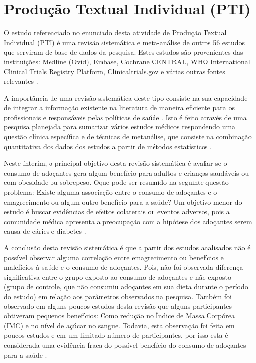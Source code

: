 \chapter{Produção Textual Individual (PTI)}
\label{pti}

O estudo referenciado no enunciado desta atividade de Produção Textual Individual (PTI)
é uma revisão sistemática e meta-análise
de outros 56 estudos que serviram de base de dados da pesquisa.
Estes estudos são provenientes das
instituições:
Medline (Ovid), Embase, Cochrane CENTRAL, WHO
International Clinical Trials Registry Platform,
Clinicaltrials.gov e várias outras fontes relevantes \cite{estudo}.

A importância de uma revisão sistemática deste tipo consiste na sua capacidade de integrar
a informação existente na literatura de maneira eficiente para os profissionais e
responsáveis pelas políticas de saúde \cite{mulrow}. Isto é feito
através de uma pesquisa planejada para sumarizar vários estudos
médicos respondendo uma questão clínica específica e de técnicas de
metanálise, que consiste na combinação
quantitativa dos dados dos estudos a partir de métodos estatísticos \cite{meta}.


Neste ínterim, o principal objetivo desta revisão sistemática é
avaliar se o consumo de adoçantes
gera algum benefício para
adultos e crianças saudáveis ou com obesidade ou sobrepeso. Oque pode ser
resumido na seguinte questão-problema: Existe alguma associação entre o consumo de adoçantes
e o emagrecimento ou algum outro benefício para a saúde?
Um objetivo menor do estudo é buscar evidências de efeitos colaterais ou eventos adversos,
pois a comunidade médica apresenta a preocupação com a hipótese dos adoçantes serem causa
de cáries e diabetes \cite{estudo}. 

A conclusão desta revisão sistemática é
que a partir dos estudos analisados não é possível observar alguma correlação entre
emagrecimento ou benefícios e malefícios à saúde e o consumo de adoçantes.
Pois, não foi observada diferença significativa
entre o grupo exposto ao consumo de adoçantes e não exposto (grupo de controle, que não consumiu adoçantes em sua dieta durante o período do estudo) em relação aos parâmetros observados na pesquisa.
Também foi observado em alguns poucos estudos desta revisão
que alguns participantes obtiveram pequenos benefícios: Como
redução no Índice de Massa Corpórea (IMC) e no nível de açúcar no sangue.
Todavia, esta observação foi feita em poucos estudos e em um limitado número
de participantes, por isso esta é considerada uma evidência fraca do possível benefício
do consumo de adoçantes para a saúde \cite{estudo}.
